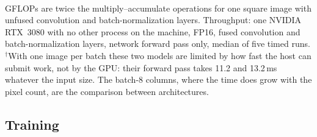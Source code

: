 \documentclass[preprint,12pt]{elsarticle}
\begin{document}
\begin{table}[t]
\centering
\caption{Parameters, computational cost and speed of the evaluated detectors.}
\label{tab:complexity}
\small
{}
\\[2pt]
\begin{minipage}{\linewidth}\footnotesize
GFLOPs are twice the multiply--accumulate operations for one square image with
unfused convolution and batch-normalization layers. Throughput: one NVIDIA
RTX~3080 with no other process on the machine, FP16, fused convolution and
batch-normalization layers, network forward pass only, median of five timed runs.
$^\dagger$With one image per batch these two models are limited by how fast the
host can submit work, not by the GPU: their forward pass takes 11.2 and 13.2\,ms
whatever the input size. The batch-8 columns, where the time does grow with the
pixel count, are the comparison between architectures.
\end{minipage}
\end{table}

\subsection{Training}
\label{sec:training}
\end{document}
